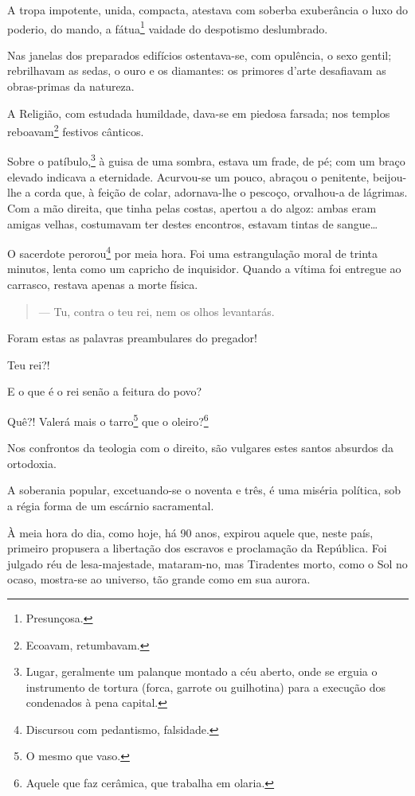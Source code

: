 {A tropa impotente, unida, compacta, atestava com soberba exuberância o
luxo do poderio, do mando, a fátua\footnote{Presunçosa.} vaidade do
despotismo deslumbrado.

Nas janelas dos preparados edifícios ostentava-se, com opulência, o sexo
gentil; rebrilhavam as sedas, o ouro e os diamantes: os primores d'arte
desafiavam as obras-primas da natureza.

A Religião, com estudada humildade, dava-se em piedosa farsada; nos
templos reboavam\footnote{Ecoavam, retumbavam.} festivos cânticos.

Sobre o patíbulo,\footnote{Lugar, geralmente um palanque montado a céu
  aberto, onde se erguia o instrumento de tortura (forca, garrote ou
  guilhotina) para a execução dos condenados à pena capital.} à guisa
de uma sombra, estava um frade, de pé; com um braço elevado indicava a
eternidade. Acurvou-se um pouco, abraçou o penitente, beijou-lhe a corda
que, à feição de colar, adornava-lhe o pescoço, orvalhou-a de lágrimas.
Com a mão direita, que tinha pelas costas, apertou a do algoz: ambas
eram amigas velhas, costumavam ter destes encontros, estavam tintas de
sangue\ldots{}

O sacerdote perorou\footnote{Discursou com pedantismo, falsidade.} por
meia hora. Foi uma estrangulação moral de trinta minutos, lenta como um
capricho de inquisidor. Quando a vítima foi entregue ao carrasco,
restava apenas a morte física.

\begin{quote}
--- Tu, contra o teu rei, nem os olhos levantarás.
\end{quote}

Foram estas as palavras preambulares do pregador!

Teu rei?!

E o que é o rei senão a feitura do povo?

Quê?! Valerá mais o tarro\footnote{O mesmo que vaso.} que o
oleiro?\footnote{Aquele que faz cerâmica, que trabalha em olaria.}

Nos confrontos da teologia com o direito, são vulgares estes santos
absurdos da ortodoxia.

A soberania popular, excetuando-se o noventa e três, é uma miséria
política, sob a régia forma de um escárnio sacramental.

\noindent\dotfill{}

À meia hora do dia, como hoje, há 90 anos, expirou aquele que, neste
país, primeiro propusera a libertação dos escravos e proclamação da
República. Foi julgado réu de lesa-majestade, mataram-no, mas Tiradentes
morto, como o Sol no ocaso, mostra-se ao universo, tão grande como em
sua aurora.

}
